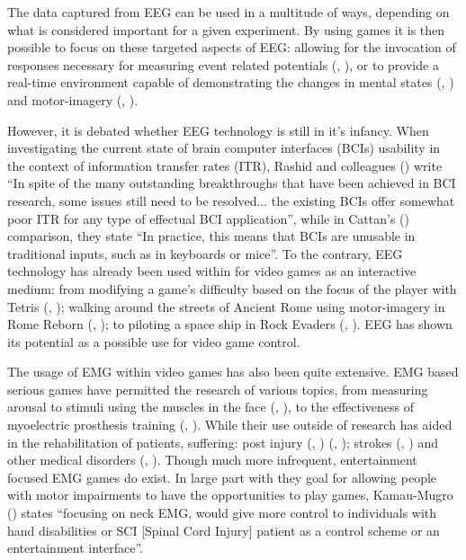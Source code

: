 \documentclass[11pt, a4paper]{article}
\newcommand{\ccite}[1]{(\citeauthor{#1}, \citeyear{#1})}
\newcommand{\cciteyear}[1]{(\citeyear{#1})}
\begin{document}
The data captured from EEG can be used in a multitude of ways, depending on what is considered important for a given experiment. By using games it is then possible to focus on these targeted aspects of EEG: allowing for the invocation of responses necessary for measuring event related potentials \ccite{ahn2011using}, or to provide a real-time environment capable of demonstrating the changes in mental states \ccite{liarokapis2015examining} and motor-imagery \ccite{ndulue2019driving}. 

However, it is debated whether EEG technology is still in it's infancy. When investigating the current state of brain computer interfaces (BCIs) usability in the context of information transfer rates (ITR), Rashid and colleagues \cciteyear{rashid2020current} write ``In spite of the many outstanding breakthroughs that have been achieved in BCI research, some issues still need to be resolved... the existing BCIs offer somewhat poor ITR for any type of effectual BCI application'', while in Cattan's \cciteyear{cattan2021use} comparison, they state ``In practice, this means that BCIs are unusable in traditional inputs, such as in keyboards or mice''. To the contrary, EEG technology has already been used within for video games as an interactive medium: from modifying a game's difficulty based on the focus of the player with Tetris \ccite{liarokapis2015examining}; walking around the streets of Ancient Rome using motor-imagery in Rome Reborn \ccite{ndulue2019driving}; to piloting a space ship in Rock Evaders \ccite{ndulue2019driving}. EEG has shown its potential as a possible use for video game control.

\hfill

The usage of EMG within video games has also been quite extensive. EMG based serious games have permitted the research of various topics, from measuring arousal to stimuli using the muscles in the face \ccite{schuurink2008engagement}, to the effectiveness of myoelectric prosthesis training \ccite{bessa2020designing}. While their use outside of research has aided in the rehabilitation of patients, suffering: post injury \ccite{gutierrez2020serious} \ccite{schonauer2011full}; strokes \ccite{ghassemi2019development} and other medical disorders \ccite{labruyere2013requirements}. Though much more infrequent, entertainment focused EMG games do exist. In large part with they goal for allowing people with motor impairments to have the opportunities to play games, Kamau-Mugro \cciteyear{muguro2020development} states ``focusing on neck EMG, would give more control to individuals with hand disabilities or SCI [Spinal Cord Injury] patient as a control scheme or an entertainment interface''.
\end{document}
